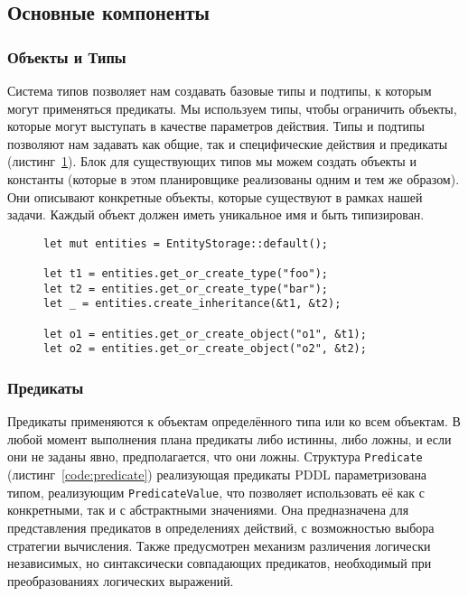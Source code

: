 \documentclass{article}
\begin{document}
\subsection{Основные компоненты}

\subsubsection{Объекты и Типы}

Система типов позволяет нам создавать базовые типы и подтипы,
к которым могут применяться предикаты.
Мы используем типы, чтобы ограничить объекты, которые могут выступать в качестве параметров действия.
Типы и подтипы позволяют нам задавать как общие, так и специфические действия и предикаты (листинг~\ref{code:entities}).
Блок для существующих типов мы можем создать объекты и константы (которые в этом планировщике реализованы одним и тем же образом).
Они описывают конкретные объекты, которые существуют в рамках нашей задачи.
Каждый объект должен иметь уникальное имя и быть типизирован.

\begin{figure}
  \begin{verbatim}
let mut entities = EntityStorage::default();

let t1 = entities.get_or_create_type("foo");
let t2 = entities.get_or_create_type("bar");
let _ = entities.create_inheritance(&t1, &t2);

let o1 = entities.get_or_create_object("o1", &t1);
let o2 = entities.get_or_create_object("o2", &t2);
  \end{verbatim}
  \label{code:entities}
\end{figure}

\subsubsection{Предикаты}

Предикаты применяются к объектам определённого типа или ко всем объектам.
В любой момент выполнения плана предикаты либо истинны, либо ложны, и если они не заданы явно,
предполагается, что они ложны.
Структура \texttt{Predicate} (листинг~\ref{code:predicate}) реализующая предикаты PDDL параметризована типом,
реализующим \texttt{PredicateValue}, что позволяет использовать её как с конкретными,
так и с абстрактными значениями. Она предназначена для представления предикатов в определениях действий,
с возможностью выбора стратегии вычисления.
Также предусмотрен механизм различения логически независимых,
но синтаксически совпадающих предикатов, необходимый при преобразованиях логических выражений.
\end{document}

